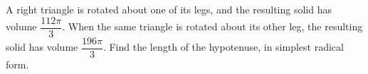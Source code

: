 A right triangle is rotated about one of its legs, and the resulting solid has volume $\dfrac{112\pi}{3}$. When the same triangle is rotated about its other leg, the resulting solid has volume $\dfrac{196\pi}{3}$. Find the length of the hypotenuse, in simplest radical form.
